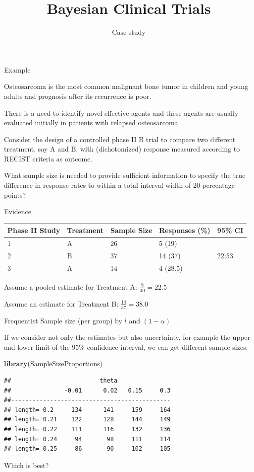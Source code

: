 \documentclass{beamer}
\title[]{Bayesian Clinical Trials}
\subtitle{Case study }
\date{}
\newenvironment{Shaded}{}{}
\newcommand{\KeywordTok}[1]{\textcolor[rgb]{0.00,0.44,0.13}{\textbf{{#1}}}}
\newcommand{\NormalTok}[1]{{#1}}
\begin{document}
\begin{frame}
\titlepage %
\end{frame}



\begin{frame}{Example}

Osteosarcoma is the most common malignant bone tumor in children and
young adults and prognosis after its recurrence is poor.

There is a need to identify novel effective agents and these agents are
usually evaluated initially in patients with relapsed osteosarcoma.

Consider the design of a controlled phase II B trial to compare two
different treatment, say A and B, with (dichotomized) response measured
according to RECIST criteria as outcome.

What sample size is needed to provide sufficient information to specify
the true difference in response rates to within a total interval width
of 20 percentage points?

\end{frame}

\begin{frame}{Evidence}

\begin{longtable}{lllll}
\toprule
Phase II Study & Treatment & Sample Size & Responses (\%) & 95\%
CI\tabularnewline
\midrule
\endhead
1 & A & 26 & 5 (19) &\tabularnewline
2 & B & 37 & 14 (37) & 22;53\tabularnewline
3 & A & 14 & 4 (28.5) &\tabularnewline
\bottomrule
\end{longtable}

Assume a pooled estimate for Treatment A: \(\frac{9}{40}=22.5\)

Assume an estimate for Treatment B: \(\frac{14}{37}=38.0\)

\end{frame}

\begin{frame}[fragile]{Frequentist Sample size (per group) by \(l\) and
\((1-\alpha)\)}

If we consider not only the estimates but also uncertainty, for example
the upper and lower limit of the 95\% confidence interval, we can get
different sample sizes:

\begin{Shaded}
\begin{Highlighting}[]
\KeywordTok{library}\NormalTok{(SampleSizeProportions)}
\end{Highlighting}
\end{Shaded}

\begin{verbatim}
##                         theta
##               -0.01 	    0.02   0.15     0.3
##---------------------------------------------
## length= 0.2     134      141     159     164
## length= 0.21    122      128     144     149
## length= 0.22    111      116     132     136
## length= 0.24     94       98     111     114
## length= 0.25     86       90     102     105
\end{verbatim}

Which is best?

\end{frame}
\end{document}
